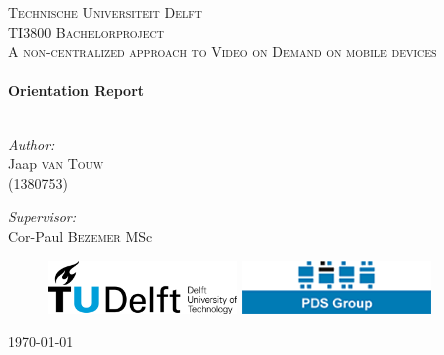 \begin{titlepage}

\begin{center}



\textsc{\Large Technische Universiteit Delft }\\[1.5cm]
\textsc{\large TI3800 Bachelorproject}\\[0.5cm]
\textsc{\normalsize A non-centralized approach to Video on Demand on mobile devices}\\[0.5cm]


\HRule \\[0.4cm]
{ \huge \bfseries Orientation Report}\\[0.4cm]

\HRule \\[1.5cm]

\begin{minipage}{0.4\textwidth}
\begin{flushleft} \large
\emph{Author:}\\
Jaap \textsc{van Touw} \\(1380753)\\ [0.1cm]
\end{flushleft}
\end{minipage}
\begin{minipage}{0.4\textwidth}
\begin{flushright} \large
\emph{Supervisor:} \\
Cor-Paul \textsc{Bezemer} MSc
\end{flushright}
\end{minipage}
\vspace{30mm}
\begin{figure}[ht!]
\centering
\includegraphics[width=50mm]{./TUDLogo.png}
\hspace{10mm}
\includegraphics[width=50mm]{./pdslogo.png}
\label{overflow}
\end{figure}
\vfill

{\large \today}

\end{center}

\end{titlepage}
